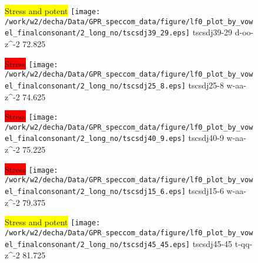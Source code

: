 \documentclass{article}
\begin{document}
\begin{figure}[t]
\begin{minipage}[b]{.24\textwidth}
\colorbox{yellow}{Stress and potent}
\centering
\texttt{[image: /work/w2/decha/Data/GPR\_speccom\_data/figure/lf0\_plot\_by\_vowel\_finalconsonant/2\_long\_no/tscsdj39\_29.eps]}
tscsdj39-29 d-oo-z\textasciicircum-2 72.825
\end{minipage}
\begin{minipage}[b]{.24\textwidth}
\colorbox{red}{Stress}
\centering
\texttt{[image: /work/w2/decha/Data/GPR\_speccom\_data/figure/lf0\_plot\_by\_vowel\_finalconsonant/2\_long\_no/tscsdj25\_8.eps]}
tscsdj25-8 w-aa-z\textasciicircum-2 74.625
\end{minipage}
\begin{minipage}[b]{.24\textwidth}
\colorbox{red}{Stress}
\centering
\texttt{[image: /work/w2/decha/Data/GPR\_speccom\_data/figure/lf0\_plot\_by\_vowel\_finalconsonant/2\_long\_no/tscsdj40\_9.eps]}
tscsdj40-9 w-aa-z\textasciicircum-2 75.225
\end{minipage}
\begin{minipage}[b]{.24\textwidth}
\colorbox{red}{Stress}
\centering
\texttt{[image: /work/w2/decha/Data/GPR\_speccom\_data/figure/lf0\_plot\_by\_vowel\_finalconsonant/2\_long\_no/tscsdj15\_6.eps]}
tscsdj15-6 w-aa-z\textasciicircum-2 79.375
\end{minipage}
\end{figure}

\begin{figure}[t]
\begin{minipage}[b]{.24\textwidth}
\colorbox{yellow}{Stress and potent}
\centering
\texttt{[image: /work/w2/decha/Data/GPR\_speccom\_data/figure/lf0\_plot\_by\_vowel\_finalconsonant/2\_long\_no/tscsdj45\_45.eps]}
tscsdj45-45 t-qq-z\textasciicircum-2 81.725
\end{minipage}
\end{figure}
\end{document}
